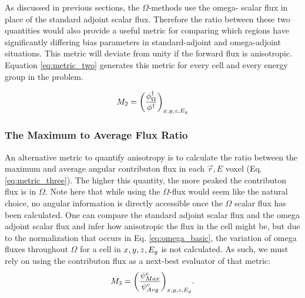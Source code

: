 As discussed in previous sections, the $\Omega$-methods use the omega- scalar
flux in place of the standard adjoint scalar flux. Therefore the ratio between
these two quantities would also provide a useful metric for comparing which
regions have significantly differing bias parameters in standard-adjoint and
omega-adjoint situations. This metric will deviate from unity if the forward
flux is anisotropic. Equation \ref{eq:metric_two} generates this metric for
every cell and every energy group in the problem.

\begin{equation}
  M_{2} = \bigg(\frac{\phi^{\dagger}_{\Omega}}{\phi^{\dagger}}\bigg)_{x,y,z,E_g}
  \label{eq:metric_two}
\end{equation}

\subsubsection{The Maximum to Average Flux Ratio}

An alternative metric to quantify anisotropy is to calculate the ratio between
the maximum and average angular contributon flux in each $\vec{r} , E$ voxel (Eq.
\ref{eq:metric_three}).
The higher this quantity, the more peaked the contributon flux is in $\Omega$.
Note here that while using the $\Omega$-flux would seem like the natural choice,
no angular information is directly accessible once the $\Omega$ scalar flux has
been calculated. One can compare the standard adjoint scalar flux and the omega
adjoint scalar flux and infer how anisotropic the flux in the cell might be, but
due to the normalization that occurs in Eq. \ref{eq:omega_basic}, the
variation of omega fluxes throughout $\Omega$ for a cell in $x,y,z,E_g$ is not
calculated. As such, we must rely on using the contributon flux as a next-best
evaluator of that metric:
%
\begin{equation}
  M_{3} = \bigg(\frac{\psi^{c}_{Max}}{\psi^{c}_{
          Avg}}\bigg)_{x,y,z,E_g}  .
  \label{eq:metric_three}
\end{equation}

